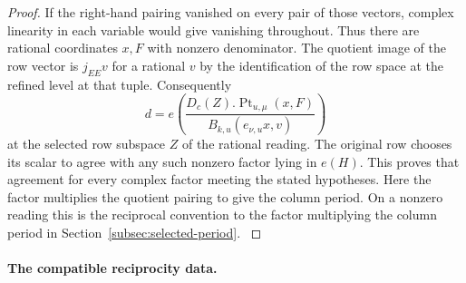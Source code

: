 \begin{proof}
If the right-hand pairing
vanished on every pair of those vectors, complex linearity in
each variable would give vanishing throughout. Thus there
are rational coordinates \(x,F\) with nonzero denominator.
The quotient image of the row vector is \(j_{EE}v\) for a
rational \(v\) by the identification of the row space at the refined level at that tuple.
Consequently
\[
        d=e\!\left(
          \frac{D_c(Z).\operatorname{Pt}_{u,\mu}(x,F)}
               {B_{k,u}(e_{\nu,u}x,v)}\right)
\]
at the selected row subspace \(Z\) of the rational reading.
The original row chooses its scalar to agree with any such
nonzero factor lying in \(e(H)\). This proves that agreement
for every complex factor meeting the stated hypotheses. Here
the factor multiplies the quotient pairing to give the column
period. On a nonzero reading this is the reciprocal convention
to the factor multiplying the column period in
Section~\ref{subsec:selected-period}. \label{cor:automorphic-realization-68}
\end{proof}

\paragraph{The compatible reciprocity data.}

